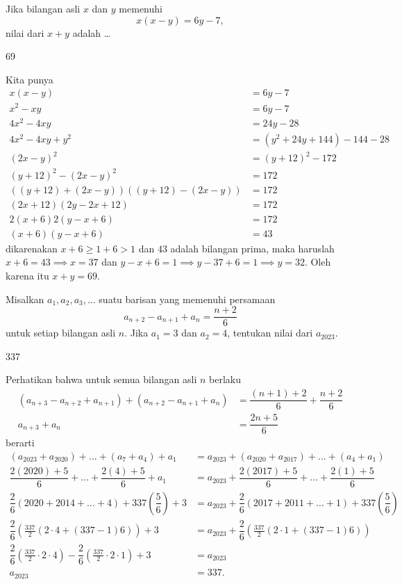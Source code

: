 \documentclass[12pt]{scrartcl}
\begin{document}
\begin{soalbaru}
Jika bilangan asli $x$ dan $y$ memenuhi
$$x(x-y)=6y-7,$$
nilai dari $x+y$ adalah \dots
\end{soalbaru}
\begin{jawaban}
69
\end{jawaban}
\begin{solusi}
Kita punya
\begin{align*}
x(x-y)&=6y-7\\
x^2-xy &= 6y - 7\\
4x^2 - 4xy &= 24y - 28\\
4x^2 - 4xy + y^2 &= (y^2 + 24y + 144) - 144 - 28\\
(2x-y)^2 &= (y+12)^2 - 172\\
(y+12)^2-(2x-y)^2 &= 172\\
((y+12)+(2x-y))((y+12)-(2x-y)) &= 172\\
(2x+12)(2y-2x+12) &= 172\\
2(x+6)2(y-x+6) &= 172\\
(x+6)(y-x+6) &= 43
\end{align*}
dikarenakan $x+6 \ge 1+6 > 1$ dan $43$ adalah bilangan prima, maka haruslah $x+6 = 43 \implies x = 37$ dan $y-x+6=1 \implies y-37+6=1 \implies y = 32$. Oleh karena itu $x+y = \boxed{69}$.
\end{solusi}

\begin{soalbaru}
Misalkan $a_1,a_2,a_3,\dots$ suatu barisan yang memenuhi persamaan
$$a_{n+2}-a_{n+1}+a_{n}=\dfrac{n+2}{6}$$
untuk setiap bilangan asli $n$. Jika $a_1=3$ dan $a_2=4$, tentukan nilai dari $a_{2023}$.
\end{soalbaru}
\begin{jawaban}
337
\end{jawaban}
\begin{solusi}
Perhatikan bahwa untuk semua bilangan asli $n$ berlaku
\begin{align*}
(a_{n+3}-a_{n+2}+a_{n+1})+(a_{n+2}-a_{n+1}+a_{n})&=\dfrac{(n+1)+2}{6}+\dfrac{n+2}{6}\\
a_{n+3}+a_{n} &= \dfrac{2n+5}{6}
\end{align*}
berarti
\begin{align*}
(a_{2023}+a_{2020})+\dots+(a_7+a_4)+a_1 &= a_{2023}+(a_{2020}+a_{2017})+\dots+(a_4+a_1) \\
\dfrac{2(2020)+5}{6}+\dots+\dfrac{2(4)+5}{6} + a_1 &= a_{2023}+\dfrac{2(2017)+5}{6}+\dots+\dfrac{2(1)+5}{6}\\
\dfrac{2}{6}(2020+2014+\dots+4) + 337\left(\dfrac{5}{6}\right)+3&= a_{2023} + \dfrac{2}{6}(2017+2011+\dots+1) + 337\left(\dfrac{5}{6}\right)\\
\dfrac{2}{6}\left(\frac{337}{2}(2\cdot 4 + (337-1)6)\right) + 3 &= a_{2023} + \dfrac{2}{6}\left(\frac{337}{2}(2\cdot 1 + (337-1)6)\right) \\
\dfrac{2}{6}\left(\frac{337}{2}\cdot 2\cdot 4\right)-\dfrac{2}{6}\left(\frac{337}{2}\cdot 2\cdot 1\right)+3 &= a_{2023}\\
a_{2023} &= \boxed{337}.
\end{align*}
\end{solusi}
\end{document}
